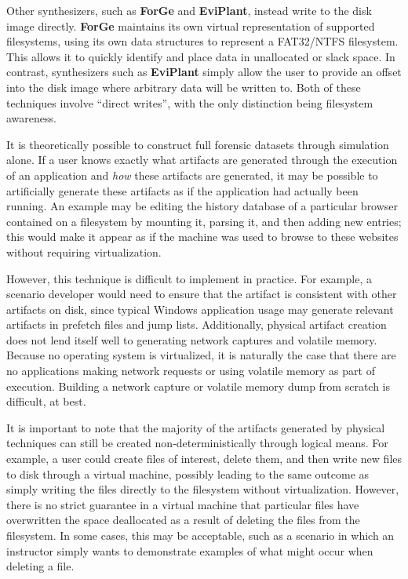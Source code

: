 Other synthesizers, such as \textbf{ForGe} and \textbf{EviPlant},
instead write to the disk image directly. \textbf{ForGe} maintains its
own virtual representation of supported filesystems, using its own data
structures to represent a FAT32/NTFS filesystem. This allows it to
quickly identify and place data in unallocated or slack space. In
contrast, synthesizers such as \textbf{EviPlant} simply allow the user
to provide an offset into the disk image where arbitrary data will be
written to. Both of these techniques involve ``direct writes'', with the
only distinction being filesystem awareness.

It is theoretically possible to construct full forensic datasets through
simulation alone. If a user knows exactly what artifacts are generated
through the execution of an application and \emph{how} these artifacts
are generated, it may be possible to artificially generate these
artifacts as if the application had actually been running. An example
may be editing the history database of a particular browser contained on
a filesystem by mounting it, parsing it, and then adding new entries;
this would make it appear as if the machine was used to browse to these
websites without requiring virtualization.

However, this technique is difficult to implement in practice. For
example, a scenario developer would need to ensure that the artifact is
consistent with other artifacts on disk, since typical Windows
application usage may generate relevant artifacts in prefetch files and
jump lists. Additionally, physical artifact creation does not lend
itself well to generating network captures and volatile memory. Because
no operating system is virtualized, it is naturally the case that there
are no applications making network requests or using volatile memory as
part of execution. Building a network capture or volatile memory dump
from scratch is difficult, at best.

It is important to note that the majority of the artifacts generated by
physical techniques can still be created non-deterministically through
logical means. For example, a user could create files of interest,
delete them, and then write new files to disk through a virtual machine,
possibly leading to the same outcome as simply writing the files
directly to the filesystem without virtualization. However, there is no
strict guarantee in a virtual machine that particular files have
overwritten the space deallocated as a result of deleting the files from
the filesystem. In some cases, this may be acceptable, such as a
scenario in which an instructor simply wants to demonstrate examples of
what might occur when deleting a file.

